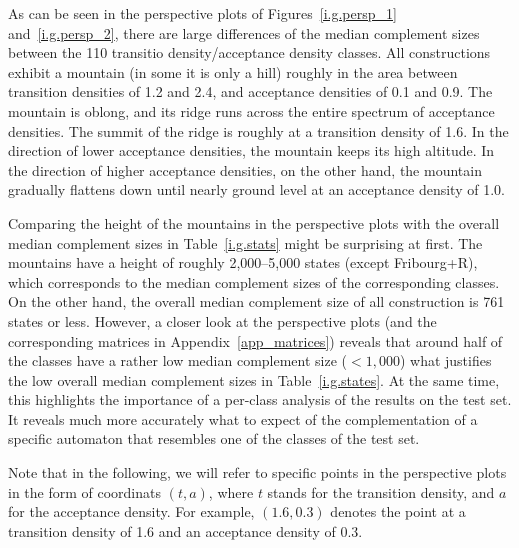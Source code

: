 As can be seen in the perspective plots of Figures~\ref{i.g.persp_1} and~\ref{i.g.persp_2}, there are large differences of the median complement sizes between the 110 transitio density/acceptance density classes. All constructions exhibit a mountain (in some it is only a hill) roughly in the area between transition densities of 1.2 and 2.4, and acceptance densities of 0.1 and 0.9. The mountain is oblong, and its ridge runs across the entire spectrum of acceptance densities. The summit of the ridge is roughly at a transition density of 1.6. In the direction of lower acceptance densities, the mountain keeps its high altitude. In the direction of higher acceptance densities, on the other hand, the mountain gradually flattens down until nearly ground level at an acceptance density of 1.0.

Comparing the height of the mountains in the perspective plots with the overall median complement sizes in Table~\ref{i.g.stats} might be surprising at first. The mountains have a height of roughly 2,000--5,000 states (except Fribourg+R), which corresponds to the median complement sizes of the corresponding classes. On the other hand, the overall median complement size of all construction is 761 states or less. However, a closer look at the perspective plots (and the corresponding matrices in Appendix~\ref{app_matrices}) reveals that around half of the classes have a rather low median complement size ($< 1,000$) what justifies the low overall median complement sizes in Table~\ref{i.g.states}. At the same time, this highlights the importance of a per-class analysis of the results on the \goal{} test set. It reveals much more accurately what to expect of the complementation of a specific automaton that resembles one of the classes of the \goal{} test set.


Note that in the following, we will refer to specific points in the perspective plots in the form of coordinats $(t,a)$, where $t$ stands for the transition density, and $a$ for the acceptance density. For example, $(1.6,0.3)$ denotes the point at a transition density of 1.6 and an acceptance density of 0.3.

